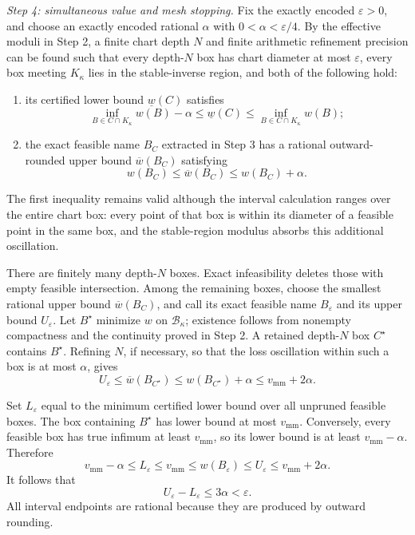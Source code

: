 \emph{Step 4: simultaneous value and mesh stopping.}
Fix the exactly encoded \(\varepsilon>0\), and choose an exactly encoded rational \(\alpha\) with \(0<\alpha<\varepsilon/4\).  By the effective moduli in Step 2, a finite chart depth \(N\) and finite arithmetic refinement precision can be found such that every depth-\(N\) box has chart diameter at most \(\varepsilon\), every box meeting \(K_\kappa\) lies in the stable-inverse region, and both of the following hold:
\begin{enumerate}
\item its certified lower bound \(\underline w(C)\) satisfies
\[
\inf_{B\in C\cap K_\kappa}w(B)-\alpha
\le \underline w(C)
\le \inf_{B\in C\cap K_\kappa}w(B);
\]
\item the exact feasible name \(B_C\) extracted in Step 3 has a rational outward-rounded upper bound \(\overline w(B_C)\) satisfying
\[
w(B_C)\le\overline w(B_C)\le w(B_C)+\alpha.
\]
\end{enumerate}
The first inequality remains valid although the interval calculation ranges over the entire chart box: every point of that box is within its diameter of a feasible point in the same box, and the stable-region modulus absorbs this additional oscillation.

There are finitely many depth-\(N\) boxes.  Exact infeasibility deletes those with empty feasible intersection.  Among the remaining boxes, choose the smallest rational upper bound \(\overline w(B_C)\), and call its exact feasible name \(B_{\varepsilon}\) and its upper bound \(U_{\varepsilon}\).  Let \(B^\star\) minimize \(w\) on \(\mathcal B_\kappa\); existence follows from nonempty compactness and the continuity proved in Step 2.  A retained depth-\(N\) box \(C^\star\) contains \(B^\star\).  Refining \(N\), if necessary, so that the loss oscillation within such a box is at most \(\alpha\), gives
\[
U_{\varepsilon}
\le\overline w(B_{C^\star})
\le w(B_{C^\star})+\alpha
\le v_{\mathrm{mm}}+2\alpha.
\]

Set \(L_{\varepsilon}\) equal to the minimum certified lower bound over all unpruned feasible boxes.  The box containing \(B^\star\) has lower bound at most \(v_{\mathrm{mm}}\).  Conversely, every feasible box has true infimum at least \(v_{\mathrm{mm}}\), so its lower bound is at least \(v_{\mathrm{mm}}-\alpha\).  Therefore
\[
v_{\mathrm{mm}}-\alpha
\le L_{\varepsilon}
\le v_{\mathrm{mm}}
\le w(B_{\varepsilon})
\le U_{\varepsilon}
\le v_{\mathrm{mm}}+2\alpha.
\]
It follows that
\[
U_{\varepsilon}-L_{\varepsilon}
\le3\alpha<\varepsilon.
\]
All interval endpoints are rational because they are produced by outward rounding.

